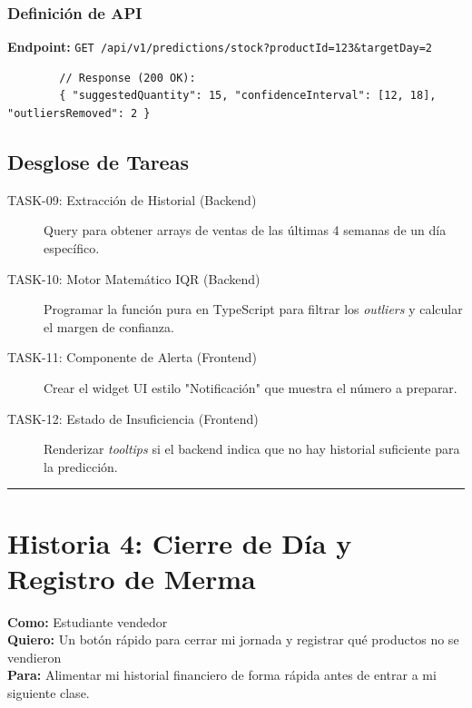 \documentclass[11pt, letterpaper]{article}
\begin{document}
    \subsubsection*{Definición de API}
    \textbf{Endpoint:} \texttt{GET /api/v1/predictions/stock?productId=123\&targetDay=2}
    \begin{verbatim}
        // Response (200 OK):
        { "suggestedQuantity": 15, "confidenceInterval": [12, 18], "outliersRemoved": 2 }
    \end{verbatim}
   
    \subsection{Desglose de Tareas}
    \begin{description}
        \item[TASK-09: Extracción de Historial (Backend)] Query para obtener arrays de ventas de las últimas 4 semanas de un día específico.
        \item[TASK-10: Motor Matemático IQR (Backend)] Programar la función pura en TypeScript para filtrar los \textit{outliers} y calcular el margen de confianza.
        \item[TASK-11: Componente de Alerta (Frontend)] Crear el widget UI estilo "Notificación" que muestra el número a preparar.
        \item[TASK-12: Estado de Insuficiencia (Frontend)] Renderizar \textit{tooltips} si el backend indica que no hay historial suficiente para la predicción.
    \end{description}

    \vspace{1em}
    \hrule
    \vspace{2em}

    \section{Historia 4: Cierre de Día y Registro de Merma}
   
    \begin{tcolorbox}[colback=teal!5!white,colframe=teal!75!black,title=HU-04: Cierre de Caja]
        \textbf{Como:} Estudiante vendedor \\
        \textbf{Quiero:} Un botón rápido para cerrar mi jornada y registrar qué productos no se vendieron \\
        \textbf{Para:} Alimentar mi historial financiero de forma rápida antes de entrar a mi siguiente clase.
    \end{tcolorbox}
   
\end{document}
